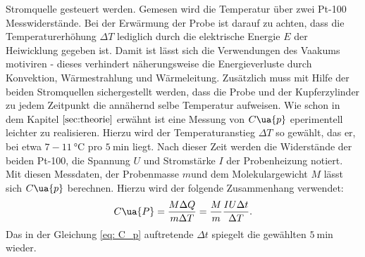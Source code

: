 Stromquelle gesteuert werden. Gemesen wird die Temperatur über zwei
Pt-100 Messwiderstände. Bei der Erwärmung der Probe ist darauf zu achten, dass
die Temperaturerhöhung $\Delta T$ lediglich durch die elektrische Energie $E$
der Heiwicklung gegeben ist. Damit ist lässt sich die Verwendungen des Vaakums motiviren -
dieses verhindert näherungsweise die Energieverluste durch Konvektion, Wärmestrahlung und
Wärmeleitung. Zusätzlich muss mit Hilfe der beiden Stromquellen sichergestellt
werden, dass die Probe und der Kupferzylinder zu jedem Zeitpunkt die annähernd
selbe Temperatur aufweisen.
Wie schon in dem Kapitel $\ref{sec:theorie}$ erwähnt
ist eine Messung von $C\ua{p}$ eperimentell leichter zu realisieren.
Hierzu wird der Temperaturanstieg $\Delta T$ so gewählt, das er, bei
etwa $7-\SI{11}{\degreeCelsius}$ pro $\SI{5}{\minute}$ liegt. Nach dieser Zeit werden die
Widerstände der beiden Pt-100, die Spannung $U$ und Stromstärke $I$ der Probenheizung notiert.
Mit diesen Messdaten, der Probenmasse $m $und dem Molekulargewicht $M$ lässt sich $C\ua{p}$
berechnen. Hierzu wird der folgende Zusammenhang verwendet:
\begin{equation}
  \label{eq: C_p}
  C\ua{P}=\frac{M \Delta Q}{m\Delta T} = \frac{M}{m}\frac{IU\Delta t}{\Delta T}.
\end{equation}
Das in der Gleichung \eqref{eq: C_p} auftretende $\Delta t$ spiegelt die gewählten $\SI{5}{\minute}$
wieder.
